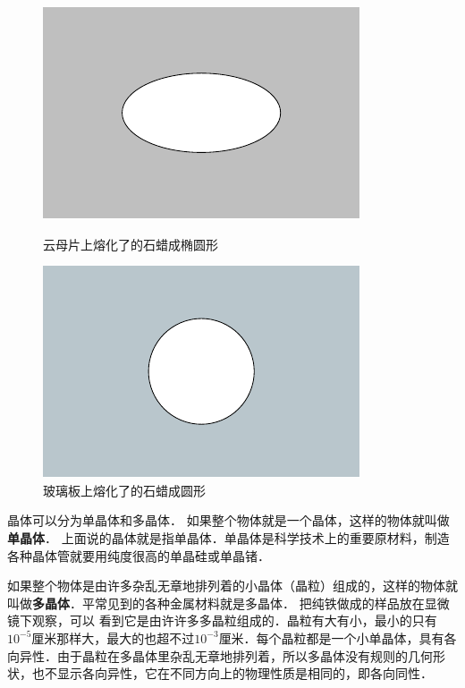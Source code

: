 \begin{figure}[htbp]
    \centering
    \begin{minipage}{0.47\linewidth}
    	\centering
    	\includegraphics{fig/B/4-2.pdf}
    	\caption{云母片上熔化了的石蜡成椭圆形}\label{fig_B_4-2}
    \end{minipage}
    \hfill
    \begin{minipage}{0.47\linewidth}
    	\centering
    	\includegraphics{fig/B/4-3.pdf}
    	\caption{玻璃板上熔化了的石蜡成圆形}\label{fig_B_4-3}
    \end{minipage}
\end{figure}


晶体可以分为单晶体和多晶体．
如果整个物体就是一个晶体，这样的物体就叫做\textbf{单晶体}．
上面说的晶体就是指单晶体．单晶体是科学技术上的重要原材料，制造各种晶体管就要用纯度很高的单晶硅或单晶锗．

如果整个物体是由许多杂乱无章地排列着的小晶体（晶粒）组成的，这样的物体就叫做\textbf{多晶体}．平常见到的各种金属材料就是多晶体．
把纯铁做成的样品放在显微镜下观察，可以
看到它是由许许多多晶粒组成的．晶粒有大有小，最小的只有$10^{-5}$厘米那样大，最大的也超不过$10^{-3}$厘米．每个晶粒都是一个小单晶体，具有各向异性．由于晶粒在多晶体里杂乱无章地排列着，所以多晶体没有规则的几何形状，也不显示各向异性，它在不同方向上的物理性质是相同的，即各向同性．

